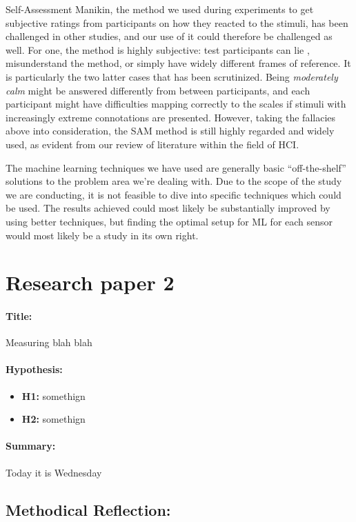 Self-Assessment Manikin, the method we used during experiments to get subjective
ratings from participants on how they reacted to the stimuli, has been
challenged in other studies, and our use of it could therefore be challenged as
well. For one, the method is highly subjective: test participants can lie ,
misunderstand the method, or simply have widely different frames of
reference. It is particularly the two latter cases that has been
scrutinized. Being \textit{moderately calm} might be answered differently from
between participants, and each participant might have difficulties mapping
correctly to the scales if stimuli with increasingly extreme connotations are
presented. However, taking the fallacies above into consideration, the SAM
method is still highly regarded and widely used, as evident from our review of
literature within the field of HCI. 

The machine learning techniques we have used are generally basic ``off-the-shelf'' solutions to the problem area we're dealing with.
Due to the scope of the study we are conducting, it is not feasible to dive into specific techniques which could be used. 
The results achieved could most likely be substantially improved by using better techniques, but finding the optimal setup for ML for each sensor would most likely be a study in its own right.


\section{Research paper 2}
\paragraph{Title:}
Measuring blah blah
\paragraph{Hypothesis:}
\begin{itemize}
    \item \textbf{H1:} somethign
    \item \textbf{H2:} somethign
\end{itemize}
\paragraph{Summary:} Today it is Wednesday
\subsection{Methodical Reflection:}

